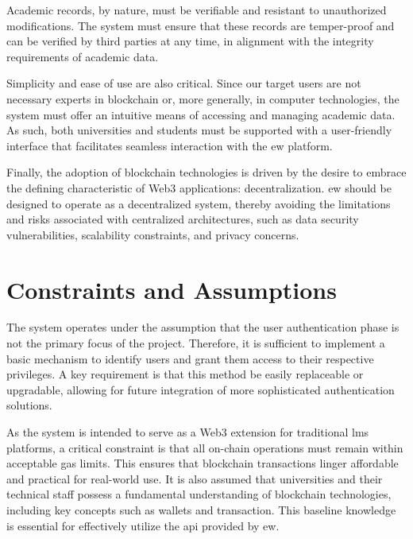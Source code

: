 Academic records, by nature, must be verifiable and resistant to unauthorized modifications. The system must ensure that these records are temper-proof and can be verified by third parties at any time, in alignment with the integrity requirements of academic data.

Simplicity and ease of use are also critical. Since our target users are not necessary experts in blockchain or, more generally, in computer technologies, the system must offer an intuitive means of accessing and managing academic data. As such, both universities and students must be supported with a user-friendly interface that facilitates seamless interaction with the \acrshort{ew} platform.

Finally, the adoption of blockchain technologies is driven by the desire to embrace the defining characteristic of Web3 applications: decentralization. \acrshort{ew} should be designed to operate as a decentralized system, thereby avoiding the limitations and risks associated with centralized architectures, such as data security vulnerabilities, scalability constraints, and privacy concerns. %


\section{Constraints and Assumptions}
The system operates under the assumption that the user authentication phase is not the primary focus of the project. Therefore, it is sufficient to implement a basic mechanism to identify users and grant them access to their respective privileges. A key requirement is that this method be easily replaceable or upgradable, allowing for future integration of more sophisticated authentication solutions.

As the system is intended to serve as a Web3 extension for traditional \acrshort{lms} platforms, a critical constraint is that all on-chain operations must remain within acceptable gas limits. This ensures that blockchain transactions linger affordable and practical for real-world use. It is also assumed that universities and their technical staff possess a fundamental understanding of blockchain technologies, including key concepts such as wallets and transaction. This baseline knowledge is essential for effectively utilize the \acrshort{api} provided by \acrshort{ew}.